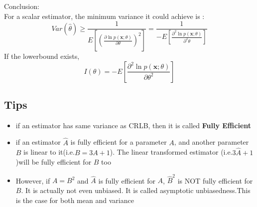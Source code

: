 \documentclass{article}
\begin{document}
Conclusion:\\
For a scalar estimator, the minimum variance it could achieve is :$$ Var(\hat{\theta})\geq \frac{1}{E[(\frac{\partial \ln{p(\bm{x};\theta)}}{\partial \theta})^2]}=\frac{1}{-E[\frac{\partial^2 \ln{p(\bm{x};\theta)}}{\partial^2 \theta}]}  $$
If the lowerbound exists, $$ I(\theta)=-E[\frac{\partial^2\ln p(\bm{x};\theta)}{\partial\theta^2}] $$
\subsection{Tips}
\begin{itemize}
    \item if an estimator has same variance as CRLB, then it is called \textbf{Fully Efficient}%
    \item if an estimator $\hat{A}$ is fully efficient for a parameter $A$, and another parameter $B$ is linear to it(i.e.$B=3A+1$). The linear transformed estimator (i.e.$3\hat{A}+1$)will be fully efficient for $B$ too
    \item However, if $A=B^2$ and $\hat{A}$ is fully efficient for $A$, $\hat{B}^2$ is NOT fully efficient for $B$. It is actually not even unbiased. It is called asymptotic unbiasedness.This is the case for both mean and variance
\end{itemize}
\end{document}
